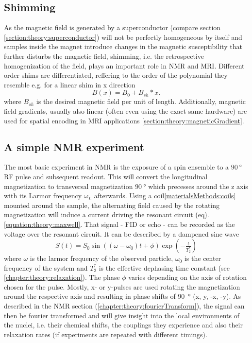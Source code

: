         \subsection{Shimming}
        As the magnetic field is generated by a superconductor (compare section \ref{section:theory:superconductor}) will not be perfectly homogeneous by itself and samples inside the magnet introduce changes in the magnetic susceptibility that further disturbs the magnetic field, shimming, i.e. the retrospective homogenization of the field, plays an important role in NMR and MRI. Different order shims are differentiated, reffering to the order of the polynomial they resemble e.g. for a linear shim in x direction
            \begin{equation}
                B(x) = B_0 + B_{sh} * x.
            \end{equation}
            where $B_{sh}$ is the desired magnetic field per unit of length.
            Additionally, magnetic field gradients, usually also linear (often even using the exact same hardware) are used for spatial encoding in MRI applications \ref{section:theory:magneticGradient}.
        \subsection{A simple NMR experiment}
        The most basic experiment in NMR is the exposure of a spin ensemble to a $\SI{90}{\degree}$ RF pulse and subsequent readout. This will convert the longitudinal magnetization to transversal magnetization $\SI{90}{\degree}$ which precesses around the z axis with its Larmor frequency $\omega_L$ afterwards. Using a coil\ref{materialsMethods:coils} mounted around the sample, the alternating field caused by the rotating magnetization will induce a current driving the resonant circuit (eq). \ref{equation:theory:maxwell}. That signal - FID or echo - can be recorded as the voltage over the resonant circuit. It can be described by a dampened sine wave
            \begin{equation}
                S(t) = S_0 \sin((\omega - \omega_0)  t + \phi) \exp(-\tfrac{t}{T_2^*})
            \end{equation}
            where $\omega$ is the larmor frequency of the observed particle, $\omega_0$ is the center frequency of the system and $T_2^*$ is the effective dephasing time constant (see \ref{chapter:theory:relaxation}). The phase $\phi$ varies depending on the axis of rotation chosen for the pulse. Mostly, x- or y-pulses are used rotating the magnetization around the respective axis and resulting in phase shifts of \SI{90}{\degree} (x, y, -x, -y). As described in the NMR section (\ref{chapter:theory:fourierTransform}), the signal can then be fourier transformed and will give insight into the local environments of the nuclei, i.e. their chemical shifts, the couplings they experience and also their relaxation rates (if experiments are repeated with different timings). 
